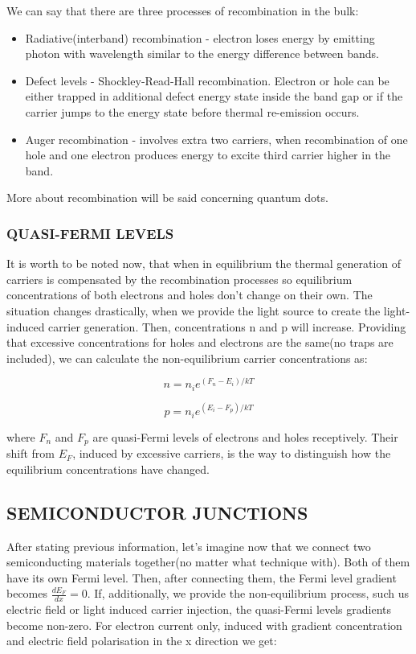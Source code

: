 We can say that there are three processes of recombination in the bulk:
\begin{itemize}
\item Radiative(interband) recombination - electron loses energy by emitting photon with wavelength similar to the energy difference between bands.
\item Defect levels - Shockley-Read-Hall recombination. Electron or hole can be either trapped in additional defect energy state inside the band gap or if the carrier jumps to the energy state before thermal re-emission occurs. 
\item Auger recombination - involves extra two carriers, when recombination of one hole and one electron produces energy to excite third carrier higher in the band. 
\end{itemize}

More about recombination will be said   concerning quantum dots.\cite{popko} \cite{pv}

\subsubsection{QUASI-FERMI LEVELS}
It is worth to be noted now, that when in equilibrium the thermal generation of carriers is compensated by the recombination processes so equilibrium concentrations of both electrons and holes don't change on their own. The situation changes drastically, when we provide the light source to create the light-induced carrier generation. Then, concentrations n and p will increase. Providing that excessive concentrations for holes and electrons are the same(no traps are included), we can calculate the non-equilibrium carrier concentrations as:

\begin{equation}
n = n_ie^{(F_n-E_i)/kT}
\end{equation}

\begin{equation}
p = n_ie^{(E_i-F_p)/kT}
\end{equation}

where $F_n$ and $F_p$ are quasi-Fermi levels of electrons and holes receptively. Their shift from $E_F$, induced by excessive carriers, is the way to distinguish how the equilibrium concentrations have changed. 
\subsection{SEMICONDUCTOR JUNCTIONS}

After stating previous information, let's imagine now that we connect two semiconducting materials together(no matter what technique with). Both of them have its own Fermi level. Then, after connecting them, the Fermi level gradient becomes $\frac{dE_F}{dx}=0$. If, additionally, we provide the non-equilibrium process, such us electric field or light induced carrier injection, the quasi-Fermi levels gradients become non-zero. For electron current only, induced with gradient concentration and electric field polarisation in the x direction we get: 

